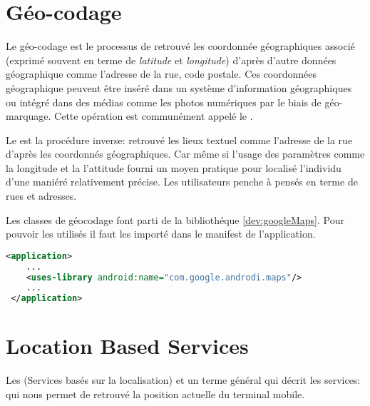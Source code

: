 \section{Géo-codage}
Le géo-codage est le processus de retrouvé les coordonnée géographiques associé (exprimé souvent en terme de \textit{latitude} et \textit{longitude}) d'après d'autre données géographique comme l’adresse de la rue, code postale. Ces coordonnées géographique peuvent être inséré dans un système d'information géographiques ou intégré dans des médias comme les photos numériques par le biais de géo-marquage. Cette opération est communément appelé le .

Le  est la procédure inverse: retrouvé les lieux textuel comme l'adresse de la rue d'après les coordonnés géographiques. Car même si l'usage des paramètres comme la longitude et la l'attitude fourni un moyen pratique pour localisé l'individu d'une maniéré relativement précise. Les utilisateurs penche à pensés en terme de rues et adresses.
\cite{wiki:geocoding}

Les classes de géocodage font parti de la bibliothéque  \ref{dev:googleMaps}. Pour pouvoir les utilisés il faut les importé dans le manifest de l'application.
 \begin{lstlisting}[language=xml, caption=Importé la bibliothéque GoogleMaps.]
 <application>
 	...
 	<uses-library android:name="com.google.androdi.maps"/>
 	...
 </application>
 \end{lstlisting}
\section{Location Based Services}%
Les  (Services basés sur la localisation) et un terme général qui décrit les services: qui nous permet de retrouvé la position actuelle du terminal mobile.

